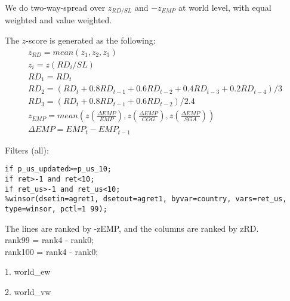 

\usepackage[T1]{fontenc}




\thispagestyle{fancy}

\newcommand{\code}{\texttt}
\newcommand*{\Commonpath}{20181217/SL}

We do two-way-spread over $z_{RD/SL}$ and $-z_{EMP}$ at world level, with equal weighted and value weighted. 

The $z$-score is generated as the following:
$$
\begin{aligned}
& z_{RD} = mean(z_1, z_2, z_3) \\
& z_i = z(RD_i/SL) \\
& RD_1 = RD_t \\
& RD_2 = (RD_t + 0.8RD_{t-1} + 0.6RD_{t-2} + 0.4RD_{t-3} + 0.2RD_{t-4})/3 \\
& RD_3 = (RD_t + 0.8RD_{t-1} + 0.6RD_{t-2})/2.4 
& \\
& z_{EMP} = mean(z(\frac{\Delta EMP}{EMP}), z(\frac{\Delta EMP}{COG}), z(\frac{\Delta EMP}{SGA})) \\
& \Delta EMP = EMP_t - EMP_{t-1}
\end{aligned}
$$


Filters (all):

\code{if p\_us\_updated>=p\_us\_10;} \\
\code{if ret>-1 and ret<10;} \\
\code{if ret\_us>-1 and ret\_us<10;} \\
\code{\%winsor(dsetin=agret1, dsetout=agret1, byvar=country, vars=ret\_us, type=winsor, pctl=1 99);}


The lines are ranked by -zEMP, and the columns are ranked by zRD. \\
rank99 = rank4 - rank0; \\
rank100 = rank4 - rank0;

\small

% 

1. world\_ew


% 

2. world\_vw




